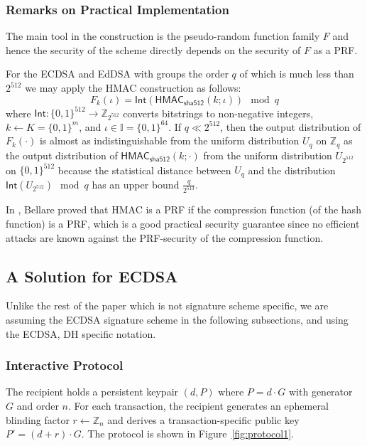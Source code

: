 \documentclass{article}
\begin{document}
\subsubsection{Remarks on Practical Implementation}

The main tool in the construction is the pseudo-random function family $F$ and hence the security of the scheme directly depends on the security of $F$ as a PRF.

For the ECDSA and EdDSA with groups the order $q$ of which is much less than $2^{512}$ we may apply the HMAC construction \cite{BeCK96} as follows:
\[
F_k(\iota) = \mathsf{Int}(\mathsf{HMAC}_{\mathsf{sha512}} (k;\iota)) \mod q
\]
where $\mathsf{Int}\colon \{0,1\}^{512}\rightarrow \mathbb{Z}_{2^{512}}$ converts bitstrings to non-negative integers, $k\gets K=\{0,1\}^{m}$, and $\iota\in\mathbb{I}=\{0,1\}^{64}$.
If
$q\ll 2^{512}$, then the output distribution
of $F_k(\cdot)$ is almost as indistinguishable
from the uniform distribution $U_q$ on $\mathbb{Z}_{q}$ as the output distribution of $\mathsf{HMAC}_{\mathsf{sha512}} (k;\cdot)$ from the uniform distribution $U_{2^{512}}$ on $\{0,1\}^{512}$
because the statistical distance between
$U_q$ and the distribution  $\mathsf{Int}(U_{2^{512}})\!\!\mod q$ has an upper bound $\frac{q}{2^{513}}$.

In \cite{Bell15}, Bellare proved that HMAC is a PRF if the compression function (of the hash function) is a PRF, which is a good practical security guarantee since no efficient attacks are known against the PRF-security of the compression function.

\subsection{A Solution for ECDSA}

Unlike the rest of the paper which is not signature scheme specific, we are assuming the ECDSA signature scheme in the following subsections, and using the ECDSA, DH specific notation.

\subsubsection{Interactive Protocol}

The recipient holds a persistent keypair $(d, P)$ where $P = d \cdot G$ with generator $G$ and order $n$. For each transaction, the recipient generates an ephemeral blinding factor $r \gets \mathbb{Z}_n$ and derives a transaction-specific public key $P' = (d + r) \cdot G$. The protocol is shown in Figure~\ref{fig:protocol1}.
\end{document}
